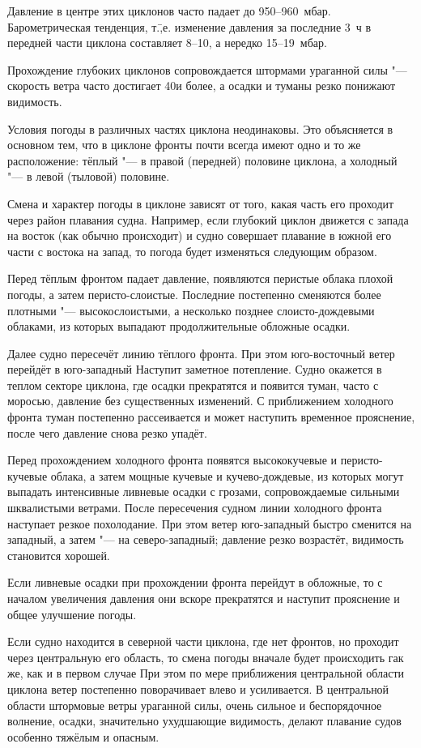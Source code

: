 Давление в центре этих циклонов часто падает до 950--960~мбар.
Барометрическая тенденция, т.\=,е. изменение давления за
последние 3~ч в передней части циклона составляет 8--10, а нередко
15--19~мбар.

Прохождение глубоких циклонов сопровождается штормами ураганной силы "---
скорость ветра часто достигает 40\speedms и более, а осадки и туманы
резко понижают видимость.

Условия погоды в различных частях циклона неодинаковы. Это объясняется
в основном тем, что в циклоне фронты почти всегда имеют одно и то же
расположение: тёплый "--- в правой (передней) половине циклона, а
холодный "--- в левой (тыловой) половине.

Смена и характер погоды в циклоне зависят от того, какая часть его
проходит через район плавания судна. Например, если глубокий циклон
движется с запада на восток (как обычно происходит) и судно совершает
плавание в южной его части с востока на запад, то погода будет
изменяться следующим образом.

Перед тёплым фронтом падает давление, появляются перистые облака
плохой погоды, а затем перисто-слоистые. Последние постепенно
сменяются более плотными "--- высокослоистыми, а несколько позднее
слоисто-дождевыми облаками, из которых выпадают продолжительные
обложные осадки.

Далее судно пересечёт линию тёплого фронта. При этом юго-восточный
ветер перейдёт в юго-западный Наступит заметное потепление. Судно
окажется в теплом секторе циклона, где осадки прекратятся и появится
туман, часто с моросью, давление без существенных изменений. С
приближением холодного фронта туман постепенно рассеивается и может
наступить временное прояснение, после чего давление снова резко
упадёт.

Перед прохождением холодного фронта появятся высококучевые и
перисто-кучевые облака, а затем мощные кучевые и кучево-дождевые, из
которых могут выпадать интенсивные ливневые осадки с грозами,
сопровождаемые сильными шквалистыми ветрами. После пересечения судном
линии холодного фронта наступает резкое похолодание. При этом ветер
юго-западный быстро сменится на западный, а затем "--- на
северо-западный; давление резко возрастёт, видимость становится
хорошей.

Если ливневые осадки при прохождении фронта перейдут в обложные, то с
началом увеличения давления они вскоре прекратятся и наступит
прояснение и общее улучшение погоды.

Если судно находится в северной части циклона, где нет фронтов, но
проходит через центральную его область, то смена погоды вначале будет
происходить гак же, как и в первом случае При этом по мере приближения
центральной области циклона ветер постепенно поворачивает влево и
усиливается. В центральной области штормовые ветры ураганной силы,
очень сильное и беспорядочное волнение, осадки, значительно ухудшающие
видимость, делают плавание судов особенно тяжёлым и опасным.

